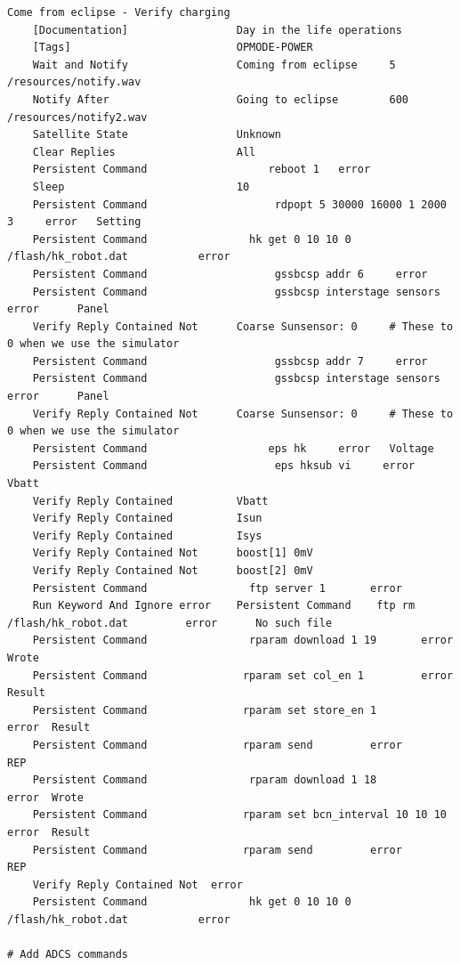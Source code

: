 \documentclass[english,12pt,a4paper,pdftex,elec,utf8]{aaltothesis}
\begin{document}
\begin{verbatim}
Come from eclipse - Verify charging
    [Documentation]                 Day in the life operations
    [Tags]                          OPMODE-POWER
    Wait and Notify                 Coming from eclipse     5   /resources/notify.wav
    Notify After                    Going to eclipse        600     /resources/notify2.wav
    Satellite State                 Unknown
    Clear Replies                   All
    Persistent Command                   reboot 1   error
    Sleep                           10
    Persistent Command                    rdpopt 5 30000 16000 1 2000 3     error   Setting
    Persistent Command                hk get 0 10 10 0 /flash/hk_robot.dat           error
    Persistent Command                    gssbcsp addr 6     error
    Persistent Command                    gssbcsp interstage sensors     error      Panel
    Verify Reply Contained Not      Coarse Sunsensor: 0     # These to 0 when we use the simulator
    Persistent Command                    gssbcsp addr 7     error
    Persistent Command                    gssbcsp interstage sensors     error      Panel
    Verify Reply Contained Not      Coarse Sunsensor: 0     # These to 0 when we use the simulator
    Persistent Command                   eps hk     error   Voltage
    Persistent Command                    eps hksub vi     error    Vbatt
    Verify Reply Contained          Vbatt
    Verify Reply Contained          Isun
    Verify Reply Contained          Isys
    Verify Reply Contained Not      boost[1] 0mV
    Verify Reply Contained Not      boost[2] 0mV
    Persistent Command                ftp server 1       error
    Run Keyword And Ignore error    Persistent Command    ftp rm /flash/hk_robot.dat         error      No such file
    Persistent Command                rparam download 1 19       error      Wrote
    Persistent Command               rparam set col_en 1         error      Result
    Persistent Command               rparam set store_en 1           error  Result
    Persistent Command               rparam send         error      REP
    Persistent Command                rparam download 1 18           error  Wrote
    Persistent Command               rparam set bcn_interval 10 10 10        error  Result
    Persistent Command               rparam send         error      REP
    Verify Reply Contained Not  error
    Persistent Command                hk get 0 10 10 0 /flash/hk_robot.dat           error

# Add ADCS commands


\end{verbatim}
\end{document}
